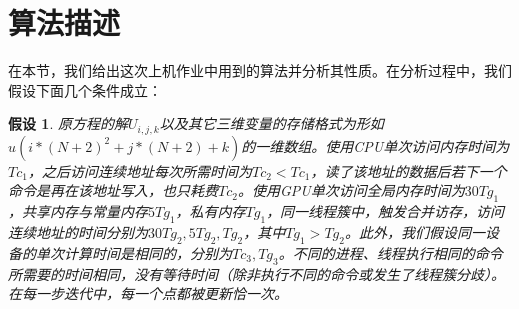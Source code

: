\documentclass{article}
\newtheorem{假设}{假设}
\begin{document}
\section{算法描述}
在本节，我们给出这次上机作业中用到的算法并分析其性质。在分析过程中，我们假设下面几个条件成立：
\begin{假设}\label{assump1}
原方程的解$U_{i,j,k}$以及其它三维变量的存储格式为形如$u(i*(N+2)^2+j*(N+2)+k)$的一维数组。使用CPU单次访问内存时间为$Tc_{1}$，之后访问连续地址每次所需时间为$Tc_{2}<Tc_{1}$，读了该地址的数据后若下一个命令是再在该地址写入，也只耗费$Tc_{2}$。使用GPU单次访问全局内存时间为$30Tg_{1}$，共享内存与常量内存$5Tg_{1}$，私有内存$Tg_{1}$，同一线程簇中，触发合并访存，访问连续地址的时间分别为$30Tg_{2},5Tg_{2},Tg_{2}$，其中$Tg_{1}>Tg_{2}$。此外，我们假设同一设备的单次计算时间是相同的，分别为$Tc_{3},Tg_{3}$。不同的进程、线程执行相同的命令所需要的时间相同，没有等待时间（除非执行不同的命令或发生了线程簇分歧）。在每一步迭代中，每一个点都被更新恰一次。
\end{假设}
\end{document}
